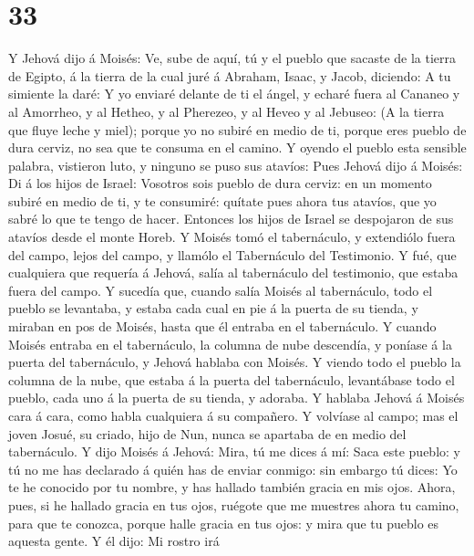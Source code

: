\hypertarget{section-32}{%
\section{33}\label{section-32}}

 Y Jehová dijo á Moisés: Ve, sube de aquí, tú y el pueblo
que sacaste de la tierra de Egipto, á la tierra de la cual juré á
Abraham, Isaac, y Jacob, diciendo: A tu simiente la daré: 
Y yo enviaré delante de ti el ángel, y echaré fuera al Cananeo y al
Amorrheo, y al Hetheo, y al Pherezeo, y al Heveo y al Jebuseo:
 (A la tierra que fluye leche y miel); porque yo no subiré
en medio de ti, porque eres pueblo de dura cerviz, no sea que te consuma
en el camino.  Y oyendo el pueblo esta sensible palabra,
vistieron luto, y ninguno se puso sus atavíos:  Pues
Jehová dijo á Moisés: Di á los hijos de Israel: Vosotros sois pueblo de
dura cerviz: en un momento subiré en medio de ti, y te consumiré:
quítate pues ahora tus atavíos, que yo sabré lo que te tengo de hacer.
 Entonces los hijos de Israel se despojaron de sus atavíos
desde el monte Horeb.  Y Moisés tomó el tabernáculo, y
extendiólo fuera del campo, lejos del campo, y llamólo el Tabernáculo
del Testimonio. Y fué, que cualquiera que requería á Jehová, salía al
tabernáculo del testimonio, que estaba fuera del campo.  Y
sucedía que, cuando salía Moisés al tabernáculo, todo el pueblo se
levantaba, y estaba cada cual en pie á la puerta de su tienda, y miraban
en pos de Moisés, hasta que él entraba en el tabernáculo. 
Y cuando Moisés entraba en el tabernáculo, la columna de nube descendía,
y poníase á la puerta del tabernáculo, y Jehová hablaba con Moisés.
 Y viendo todo el pueblo la columna de la nube, que
estaba á la puerta del tabernáculo, levantábase todo el pueblo, cada uno
á la puerta de su tienda, y adoraba.  Y hablaba Jehová á
Moisés cara á cara, como habla cualquiera á su compañero. Y volvíase al
campo; mas el joven Josué, su criado, hijo de Nun, nunca se apartaba de
en medio del tabernáculo.  Y dijo Moisés á Jehová: Mira,
tú me dices á mí: Saca este pueblo: y tú no me has declarado á quién has
de enviar conmigo: sin embargo tú dices: Yo te he conocido por tu
nombre, y has hallado también gracia en mis ojos.  Ahora,
pues, si he hallado gracia en tus ojos, ruégote que me muestres ahora tu
camino, para que te conozca, porque halle gracia en tus ojos: y mira que
tu pueblo es aquesta gente.  Y él dijo: Mi rostro irá
